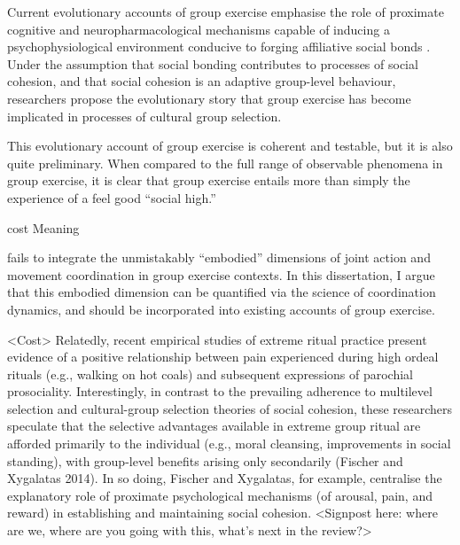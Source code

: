 Current evolutionary accounts of group exercise emphasise the role of proximate cognitive and neuropharmacological mechanisms capable of inducing a psychophysiological environment conducive to forging affiliative social bonds \citep{Dunbar2010,Cohen2017}. Under the assumption that social bonding contributes to processes of social cohesion, and that social cohesion is an adaptive group-level behaviour, researchers propose the evolutionary story that group exercise has become implicated in processes of cultural group selection.

This evolutionary account of group exercise is coherent and testable, but it is also quite preliminary.  When compared to the full range of observable phenomena in group exercise, it is clear that group exercise entails more than simply the experience of a feel good ``social high.''

cost
Meaning


fails to integrate the unmistakably ``embodied'' dimensions of joint action and movement coordination in group exercise contexts.  In this dissertation, I argue that this embodied dimension can be quantified via the science of coordination dynamics, and should be incorporated into existing accounts of group exercise.






<Cost>
Relatedly, recent empirical studies of extreme ritual practice present evidence of a positive relationship between pain experienced during high ordeal rituals (e.g., walking on hot coals) and subsequent expressions of parochial prosociality. Interestingly, in contrast to the prevailing adherence to multilevel selection and cultural-group selection theories of social cohesion, these researchers speculate that the selective advantages available in extreme group ritual are afforded primarily to the individual (e.g., moral cleansing, improvements in social standing), with group-level benefits arising only secondarily (Fischer and Xygalatas 2014). In so doing, Fischer and Xygalatas, for example, centralise the explanatory role of proximate psychological mechanisms (of arousal, pain, and reward) in establishing and maintaining social cohesion.
<Signpost here: where are we, where are you going with this, what’s next in the review?>

